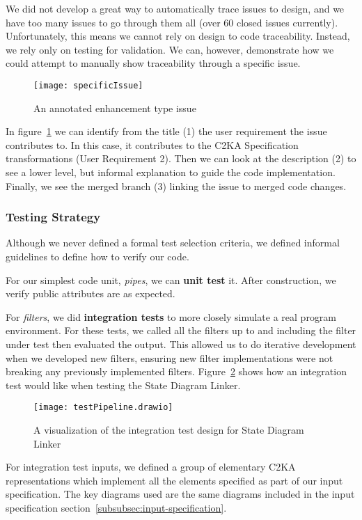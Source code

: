 We did not develop a great way to automatically trace issues to design,
and we have too many issues to go through them all (over 60 closed issues currently).
Unfortunately, this means we cannot rely on design to code traceability.
Instead, we rely only on testing for validation.
We can, however, demonstrate how we could attempt to manually show traceability through a specific issue.
\begin{figure}[ht]
    \centering
    \texttt{[image: specificIssue]}
    \caption{An annotated enhancement type issue}
    \label{fig:specificIssue}
\end{figure}
In figure~\ref{fig:specificIssue} we can identify from the title (1) the user requirement the issue contributes to.
In this case, it contributes to the C2KA Specification transformations (User Requirement 2).
Then we can look at the description (2) to see a lower level, but informal explanation to guide the code implementation.
Finally, we see the merged branch (3) linking the issue to merged code changes.

\newpage
\subsubsection{Testing Strategy}\label{subsubsec:tests-strat}
Although we never defined a formal test selection criteria,
we defined informal guidelines to define how to verify our code.

For our simplest code unit, \textit{pipes}, we can \textbf{unit test} it.
After construction, we verify public attributes are as expected.

For \textit{filters}, we did \textbf{integration tests} to more closely simulate a real program environment.
For these tests, we called all the filters up to and including the filter under test then evaluated the output.
This allowed us to do iterative development when we developed new filters,
ensuring new filter implementations were not breaking any previously implemented filters.
Figure~\ref{fig:testShowcase} shows how an integration test would like when testing the State Diagram Linker.
\begin{figure}[ht]
    \centering
    \texttt{[image: testPipeline.drawio]}
    \caption{A visualization of the integration test design for State Diagram Linker}
    \label{fig:testShowcase}
\end{figure}

For integration test inputs, we defined a group of elementary C2KA representations which implement
all the elements specified as part of our input specification.
The key diagrams used are the same diagrams included in the input specification section~\ref{subsubsec:input-specification}.

